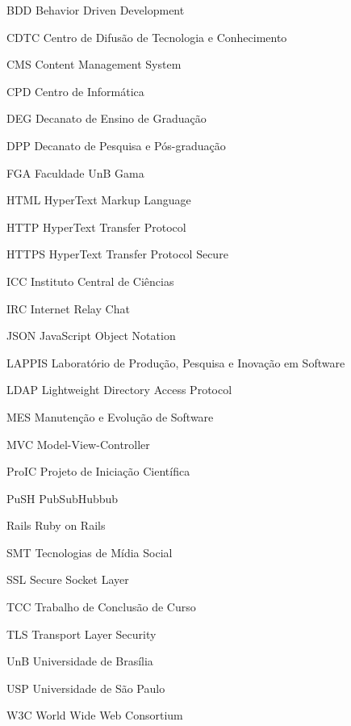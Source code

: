 \begin{siglas}
  \item[BDD] Behavior Driven Development
  \item[CDTC] Centro de Difusão de Tecnologia e Conhecimento
  \item[CMS] Content Management System
  \item[CPD] Centro de Informática
  \item[DEG] Decanato de Ensino de Graduação
  \item[DPP] Decanato de Pesquisa e Pós-graduação
  \item[FGA] Faculdade UnB Gama
  \item[HTML] HyperText Markup Language
  \item[HTTP] HyperText Transfer Protocol
  \item[HTTPS] HyperText Transfer Protocol Secure
  \item[ICC] Instituto Central de Ciências
  \item[IRC] Internet Relay Chat
  \item[JSON] JavaScript Object Notation
  \item[LAPPIS] Laboratório de Produção, Pesquisa e Inovação em Software
  \item[LDAP] Lightweight Directory Access Protocol
  \item[MES] Manutenção e Evolução de Software
  \item[MVC] Model-View-Controller
  \item[ProIC] Projeto de Iniciação Científica
  \item[PuSH] PubSubHubbub
  \item[Rails] Ruby on Rails
  \item[SMT] Tecnologias de Mídia Social
  \item[SSL] Secure Socket Layer
  \item[TCC] Trabalho de Conclusão de Curso
  \item[TLS] Transport Layer Security
  \item[UnB] Universidade de Brasília
  \item[USP] Universidade de São Paulo
  \item[W3C] World Wide Web Consortium
\end{siglas}
